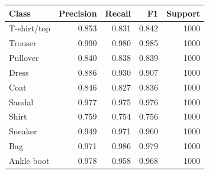\begin{tabular}{lrrrr}
\toprule
Class & Precision & Recall & F1 & Support \\
\midrule
T-shirt/top & 0.853 & 0.831 & 0.842 & 1000 \\
Trouser & 0.990 & 0.980 & 0.985 & 1000 \\
Pullover & 0.840 & 0.838 & 0.839 & 1000 \\
Dress & 0.886 & 0.930 & 0.907 & 1000 \\
Coat & 0.846 & 0.827 & 0.836 & 1000 \\
Sandal & 0.977 & 0.975 & 0.976 & 1000 \\
Shirt & 0.759 & 0.754 & 0.756 & 1000 \\
Sneaker & 0.949 & 0.971 & 0.960 & 1000 \\
Bag & 0.971 & 0.986 & 0.979 & 1000 \\
Ankle boot & 0.978 & 0.958 & 0.968 & 1000 \\
\bottomrule
\end{tabular}
